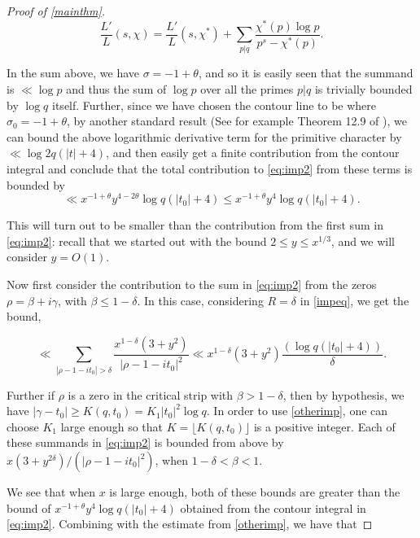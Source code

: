 \documentclass[letter,12pt]{article}
\theoremstyle{plain}
\theoremstyle{definition}
\theoremstyle{plain}
\begin{document}
\begin{proof}[Proof of \cref{mainthm}]
\begin{equation*}
    \frac{L'}{L}(s,\chi)=\frac{L'}{L}(s,\chi^{*})+\sum\limits_{p|q} \frac{\chi^{*}(p)\log p}{p^{s}-\chi^{*}(p)}.
\end{equation*}

In the sum above, we have $\sigma=-1+\theta$, and so it is easily seen that the summand is $\ll \log p$ and thus the sum of $\log p$ over all the primes $p|q$ is trivially bounded by $\log q$ itself. Further, since we have chosen the contour line to be where $\sigma_0=-1+\theta$, by another standard result (See for example Theorem 12.9 of \cite{Mont}), we can bound the above logarithmic derivative term for the primitive character by $\ll \log 2q(|t|+4)$, and then easily get a finite contribution from the contour integral and conclude that the total contribution to \cref{eq:imp2} from these terms is bounded by
\begin{equation*}
\ll x^{-1+\theta}y^{4-2\theta} \log q(|t_0|+4)\leq x^{-1+\theta}y^{4} \log q(|t_0|+4).
\end{equation*}

\noindent This will turn out to be smaller than the contribution from the first sum in \cref{eq:imp2}: recall that we started out with the bound $2\leq y \leq x^{1/3}$, and we will consider $y=O(1)$.  

Now first consider the contribution to the sum in \cref{eq:imp2} from the zeros $\rho=\beta +i\gamma$, with $\beta \leq 1-\delta$. In this case, considering $R=\delta$ in \cref{impeq}, we get the bound,

$$\ll \sum\limits_{|\rho-1-it_0|>\delta} \frac{x^{1-\delta}(3+y^{2})}{|\rho -1-it_0|^{2}} \ll x^{1-\delta}(3+y^{2}) \frac{(\log q(|t_0|+4))}{\delta}.$$

\noindent Further if $\rho$ is a zero in the critical strip with $\beta >1-\delta$, then by hypothesis, we have $|\gamma-t_0|\geq K(q,t_0)=K_{1}|t_0|^{2}\log q$. In order to use \cref{otherimp}, one can choose $K_1$ large enough so that $ K=\lfloor K(q,t_0) \rfloor$ is a positive integer. Each of these summands in \cref{eq:imp2} is bounded from above by $x(3+y^{2\delta})/(|\rho-1-it_0|^{2})$, when $1-\delta<\beta<1$.




We see that when $x$ is large enough, both of these bounds are greater than the bound of $x^{-1+\theta}y^{4}\log q(|t_0|+4)$ obtained from the contour integral in \cref{eq:imp2}. Combining with the estimate from \cref{otherimp}, we have that


\end{proof}
\end{document}
